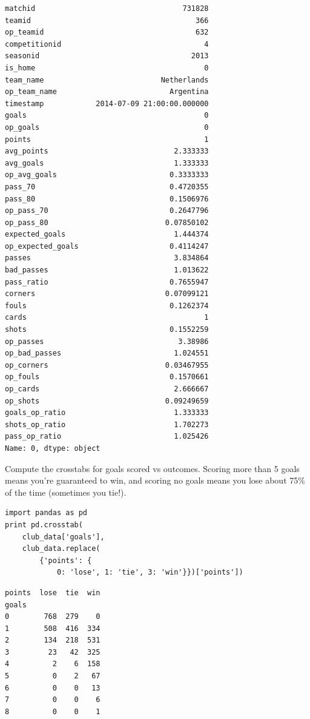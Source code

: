 \documentclass[12pt,fleqn]{article}\usepackage{common}
\begin{document}
\begin{verbatim}
matchid                                  731828
teamid                                      366
op_teamid                                   632
competitionid                                 4
seasonid                                   2013
is_home                                       0
team_name                           Netherlands
op_team_name                          Argentina
timestamp            2014-07-09 21:00:00.000000
goals                                         0
op_goals                                      0
points                                        1
avg_points                             2.333333
avg_goals                              1.333333
op_avg_goals                          0.3333333
pass_70                               0.4720355
pass_80                               0.1506976
op_pass_70                            0.2647796
op_pass_80                           0.07850102
expected_goals                         1.444374
op_expected_goals                     0.4114247
passes                                 3.834864
bad_passes                             1.013622
pass_ratio                            0.7655947
corners                              0.07099121
fouls                                 0.1262374
cards                                         1
shots                                 0.1552259
op_passes                               3.38986
op_bad_passes                          1.024551
op_corners                           0.03467955
op_fouls                              0.1570661
op_cards                               2.666667
op_shots                             0.09249659
goals_op_ratio                         1.333333
shots_op_ratio                         1.702273
pass_op_ratio                          1.025426
Name: 0, dtype: object
\end{verbatim}

Compute the crosstabs for goals scored vs outcomes. Scoring more than 5
goals means you're guaranteed to win, and scoring no goals means you lose
about 75\% of the time (sometimes you tie!).

\begin{verbatim}
import pandas as pd
print pd.crosstab(
    club_data['goals'], 
    club_data.replace(
        {'points': {
            0: 'lose', 1: 'tie', 3: 'win'}})['points'])
\end{verbatim}

\begin{verbatim}
points  lose  tie  win
goals                 
0        768  279    0
1        508  416  334
2        134  218  531
3         23   42  325
4          2    6  158
5          0    2   67
6          0    0   13
7          0    0    6
8          0    0    1
\end{verbatim}
\end{document}
